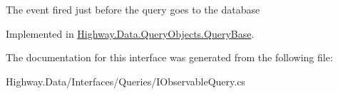 The event fired just before the query goes to the database 



Implemented in \hyperlink{class_highway_1_1_data_1_1_query_objects_1_1_query_base_a0f4a7c6fcd8e32c461633855ed00f824}{Highway.\-Data.\-Query\-Objects.\-Query\-Base}.



The documentation for this interface was generated from the following file\-:\begin{DoxyCompactItemize}
\item 
Highway.\-Data/\-Interfaces/\-Queries/I\-Observable\-Query.\-cs\end{DoxyCompactItemize}
